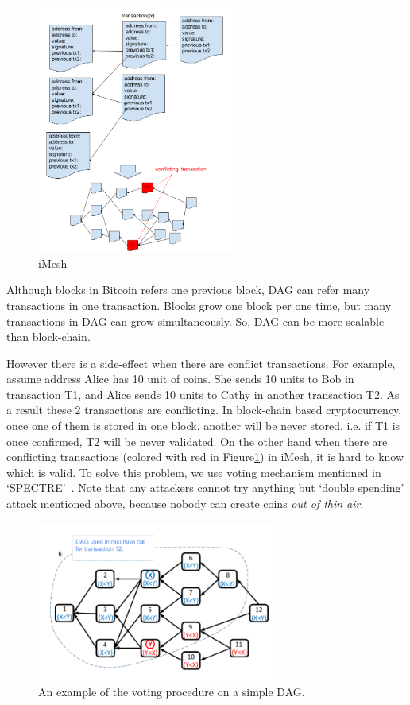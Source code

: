 \documentclass[a4paper,10pt,twocolumn]{article}
\begin{document}
\begin{figure}[ht]
	\begin{center}
	\includegraphics[width=65mm]{dag.png}
	  \caption{iMesh}
    \label{fig:imesh}
	\end{center}
 \end{figure}

Although blocks in Bitcoin refers one previous block,
DAG can refer many transactions in one transaction.
 Blocks grow one block per one time, but many transactions in DAG can grow simultaneously.
So, DAG can be more scalable than block-chain.

However there is a side-effect when there are conflict transactions.
For example, assume address Alice has 10 unit of coins.
She sends 10 units to Bob in transaction T1, and Alice sends 10 units to Cathy
in another transaction T2. As a result these 2 transactions are conflicting.
In block-chain based cryptocurrency, once one of them is stored in one block, another will be never stored,
i.e. if T1 is once confirmed,  T2 will be never validated.
On the other hand  when there are conflicting transactions (colored with red in Figure\ref{fig:imesh}) in iMesh,
it is hard to know which is valid. To solve this problem, we use voting mechanism  mentioned in `SPECTRE'~\cite{spectre}.
Note that any attackers cannot try anything but `double spending' attack mentioned above,
because nobody can create coins \emph{out of thin air}.

\begin{figure}[ht]
	\begin{center}
	\includegraphics[width=80mm]{spectre.png}
	  \caption{An example of the voting procedure  on  a  simple  DAG.}
    \label{fig:spectre}
	\end{center}
 \end{figure}
\end{document}
